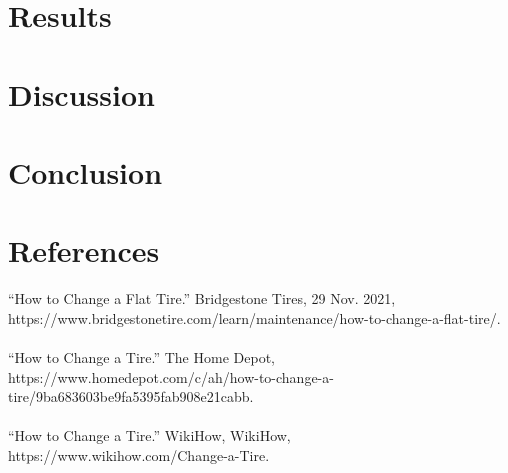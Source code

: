 \documentclass[12pt,A4paper]{article}
\begin{document}
	\section{Results}
	\section{Discussion}
	\section{Conclusion}

	\section{References}
	“How to Change a Flat Tire.” Bridgestone Tires, 29 Nov. 2021, https://www.bridgestonetire.com/learn/maintenance/how-to-change-a-flat-tire/.\\ \\
	“How to Change a Tire.” The Home Depot, https://www.homedepot.com/c/ah/how-to-change-a-tire/9ba683603be9fa5395fab908e21cabb.\\ \\
	“How to Change a Tire.” WikiHow, WikiHow, https://www.wikihow.com/Change-a-Tire.\\
	
	
\end{document}

